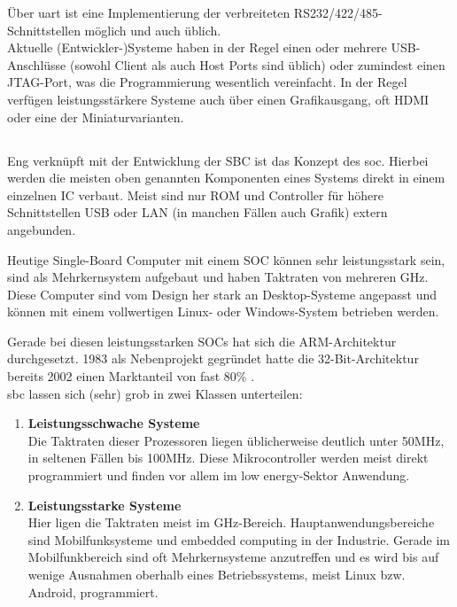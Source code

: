 Über \gls{uart} ist eine Implementierung der verbreiteten RS232/422/485-Schnittstellen möglich und auch üblich.\\

Aktuelle (Entwickler-)Systeme haben in der Regel einen oder mehrere USB-Anschlüsse (sowohl Client als auch Host Ports sind üblich) oder zumindest einen JTAG-Port, was die Programmierung wesentlich vereinfacht. In der Regel verfügen leistungsstärkere Systeme auch über einen Grafikausgang, oft HDMI oder eine der Miniaturvarianten.


\subsection{}
Eng verknüpft mit der Entwicklung der SBC ist das Konzept des \gls{soc}. Hierbei werden die meisten oben genannten Komponenten eines Systems direkt in einem einzelnen IC verbaut. Meist sind nur ROM und Controller für höhere Schnittstellen USB oder LAN (in manchen Fällen auch Grafik) extern angebunden.

Heutige Single-Board Computer mit einem SOC können sehr leistungsstark sein, sind als Mehrkernsystem aufgebaut und haben Taktraten von mehreren GHz. Diese Computer sind vom Design her stark an Desktop-Systeme angepasst und können mit einem vollwertigen Linux- oder Windows-System betrieben werden.

Gerade bei diesen leistungsstarken SOCs hat sich die ARM-Architektur durchgesetzt. 1983 als Nebenprojekt gegründet hatte die 32-Bit-Architektur bereits 2002 einen Marktanteil von fast 80\% \cite{stiller2002}.\\

\noindent \gls{sbc} lassen sich (sehr) grob in zwei Klassen unterteilen:

\begin{enumerate}
\item \textbf{Leistungsschwache Systeme}\\
Die Taktraten dieser Prozessoren liegen üblicherweise deutlich unter 50MHz, in seltenen Fällen bis 100MHz. Diese Mikrocontroller werden meist direkt programmiert und finden vor allem im low energy-Sektor Anwendung.
\item \textbf{Leistungsstarke Systeme}\\
Hier ligen die Taktraten meist im GHz-Bereich. Hauptanwendungsbereiche sind Mobilfunksysteme und embedded computing in der Industrie. Gerade im Mobilfunkbereich sind oft Mehrkernsysteme anzutreffen und es wird bis auf wenige Ausnahmen oberhalb eines Betriebssystems, meist Linux bzw. Android, programmiert.
\end{enumerate}



